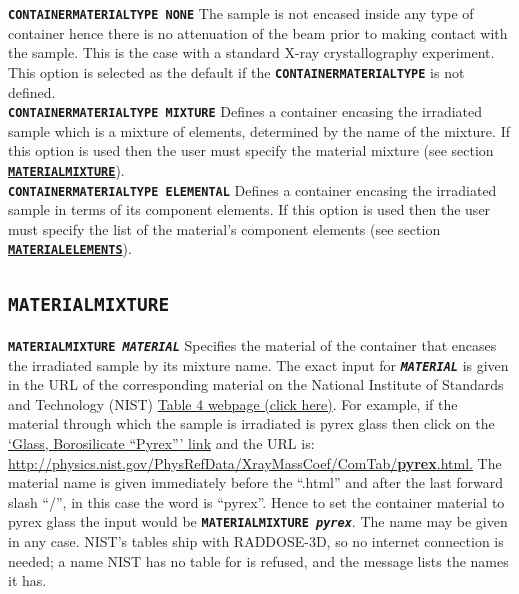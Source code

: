\documentclass[a4paper]{article}
\newcommand{\Keyword}[1]{\texttt{\textbf{#1}}\xspace}
\newcommand{\SB}{\\[0.2em]}
\begin{document}
\noindent \Keyword{CONTAINERMATERIALTYPE NONE}
The sample is not encased inside any type of container hence there is no attenuation of the beam prior to making contact with the sample. This is the case with a standard X-ray crystallography experiment. This option is selected as the default if the \Keyword{CONTAINERMATERIALTYPE} is not defined.\SB

\noindent \Keyword{CONTAINERMATERIALTYPE MIXTURE}
Defines a container encasing the irradiated sample which is a mixture of elements, determined by the name of the mixture. If this option is used then the user must specify the material mixture (see section \hyperref[materialmixture]{\Keyword{MATERIALMIXTURE}}).\SB

\noindent \Keyword{CONTAINERMATERIALTYPE ELEMENTAL}
Defines a container encasing the irradiated sample in terms of its component elements. If this option is used then the user must specify the list of the material's component elements (see section \hyperref[materialelements]{\Keyword{MATERIALELEMENTS}}).\SB

\subsection{\Keyword{MATERIALMIXTURE}}
\label{materialmixture}
\noindent \Keyword{MATERIALMIXTURE \textit{MATERIAL}}
Specifies the material of the container that encases the irradiated sample by its mixture name. The exact input for \Keyword{\textit{MATERIAL}} is given in the URL of the corresponding material on the National Institute of Standards and Technology (NIST) \href{http://physics.nist.gov/PhysRefData/XrayMassCoef/tab4.html}{Table 4 webpage (click here)}. For example, if the material through which the sample is irradiated is pyrex glass then click on the \href{http://physics.nist.gov/PhysRefData/XrayMassCoef/ComTab/pyrex.html}{`Glass, Borosilicate ``Pyrex''' link} and the URL is:
\newline
\href{http://physics.nist.gov/PhysRefData/XrayMassCoef/ComTab/pyrex.html}{http://physics.nist.gov/PhysRefData/XrayMassCoef/ComTab/\textbf{pyrex}.html.}
\newline
The material name is given immediately before the ``.html'' and after the last forward slash ``/'', in this case the word is ``pyrex''. Hence to set the container material to pyrex glass the input would be \Keyword{MATERIALMIXTURE \textit{pyrex}}. The name may be given in any case. NIST's tables ship with RADDOSE-3D, so no internet connection is needed; a name NIST has no table for is refused, and the message lists the names it has.
\end{document}

